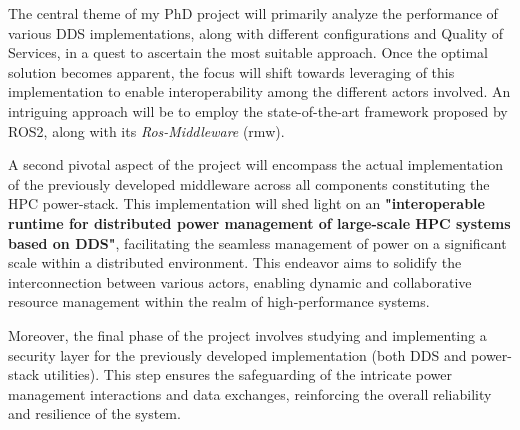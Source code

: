 The central theme of my PhD project will primarily analyze the performance of various DDS implementations, along with different configurations and Quality of Services, in a quest to ascertain the most suitable approach. Once the optimal solution becomes apparent, the focus will shift towards leveraging of this implementation to enable interoperability among the different actors involved. An intriguing approach will be to employ the state-of-the-art framework proposed by ROS2, along with its \emph{Ros-Middleware} (rmw).

A second pivotal aspect of the project will encompass the actual implementation of the previously developed middleware across all components constituting the HPC power-stack. This implementation will shed light on an \textbf{"interoperable runtime for distributed power management of large-scale HPC systems based on DDS"}, facilitating the seamless management of power on a significant scale within a distributed environment. This endeavor aims to solidify the interconnection between various actors, enabling dynamic and collaborative resource management within the realm of high-performance systems.

Moreover, the final phase of the project involves studying and implementing a security layer for the previously developed implementation (both DDS and power-stack utilities). This step ensures the safeguarding of the intricate power management interactions and data exchanges, reinforcing the overall reliability and resilience of the system.

